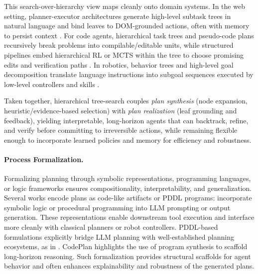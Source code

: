 This search-over-hierarchy view maps cleanly onto domain systems. In the web setting, planner-executor architectures generate high-level subtask trees in natural language and bind leaves to DOM-grounded actions, often with memory to persist context \cite{abuelsaad2024agent,guan2023intelligent,agashe2024agent}. For code agents, hierarchical task trees and pseudo-code plans recursively break problems into compilable/editable units, while structured pipelines embed hierarchical RL or MCTS within the tree to choose promising edits and verification paths \cite{gui2025hypertree,ni2024tree,chen2025enhancing,hu2025divide,antoniades2024swe}. In robotics, behavior trees and high-level goal decomposition translate language instructions into subgoal sequences executed by low-level controllers and skills \cite{lykov2024llm,cao2023robot,izzo2024btgenbot,ahn2022icanisay,huang2022inner}. 

Taken together, hierarchical tree-search couples \emph{plan synthesis} (node expansion, heuristic/evidence-based selection) with \emph{plan realization} (leaf grounding and feedback), yielding interpretable, long-horizon agents that can backtrack, refine, and verify before committing to irreversible actions, while remaining flexible enough to incorporate learned policies and memory for efficiency and robustness.


\paragraph{Process Formalization.} Formalizing planning through symbolic representations, programming languages, or logic frameworks ensures compositionality, interpretability, and generalization. Several works encode plans as code-like artifacts or PDDL programs: \cite{guan2023leveraging,mahdavi2024leveraging,katz2024thought,wen2024codeplan,hao2024planning,vyas2024llm} incorporate symbolic logic or procedural programming into LLM prompting or output generation. These representations enable downstream tool execution and interface more cleanly with classical planners or robot controllers. PDDL-based formulations explicitly bridge LLM planning with well-established planning ecosystems, as in \cite{mahdavi2024leveraging,katz2024thought}. CodePlan \cite{wen2024codeplan} highlights the use of program synthesis to scaffold long-horizon reasoning. Such formalization provides structural scaffolds for agent behavior and often enhances explainability and robustness of the generated plans.

